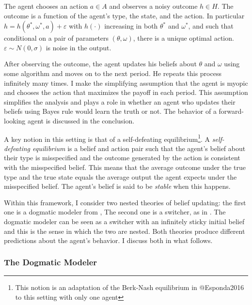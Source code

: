 \documentclass[
  12pt,
]{article}
\begin{document}
The agent chooses an action \(a\in A\) and observes a noisy outcome
\(h\in H\). The outcome is a function of the agent's type, the state,
and the action. In particular
\(h = h(\theta^*, \omega^*, a) + \varepsilon\) with \(h(\cdot)\)
increasing in both \(\theta^*\) and \(\omega^*\), and such that
conditional on a pair of parameters \((\theta, \omega)\), there is a
unique optimal action. \(\varepsilon\sim N(0, \sigma)\) is noise in the
output.

After observing the outcome, the agent updates his beliefs about
\(\theta\) and \(\omega\) using some algorithm and moves on to the next
period. He repeats this process infinitely many times. I make the
simplifying assumption that the agent is myopic and chooses the action
that maximizes the payoff in each period. This assumption simplifies the
analysis and plays a role in whether an agent who updates their beliefs
using Bayes rule would learn the truth or not. The behavior of a
forward-looking agent is discussed in the conclusion.

A key notion in this setting is that of a self-defeating
equilibrium\footnote{This notion is an adaptation of the Berk-Nash equilibrium in 
@Esponda2016 to this setting with only one agent}. A
\emph{self-defeating equilibrium} is a belief and action pair such that
the agent's belief about their type is misspecified and the outcome
generated by the action is consistent with the misspecified belief. This
means that the average outcome under the true type and the true state
equals the average output the agent expects under the misspecified
belief. The agent's belief is said to be \emph{stable} when this
happens.

Within this framework, I consider two nested theories of belief
updating: the first one is a dogmatic modeler from \citet{Heidhues2018},
The second one is a switcher, as in \citet{Ba2023}. The dogmatic modeler
can be seen as a switcher with an infinitely sticky initial belief and
this is the sense in which the two are nested. Both theories produce
different predictions about the agent's behavior. I discuss both in what
follows.

\hypertarget{the-dogmatic-modeler}{%
\subsubsection{The Dogmatic Modeler}\label{the-dogmatic-modeler}}
\end{document}
